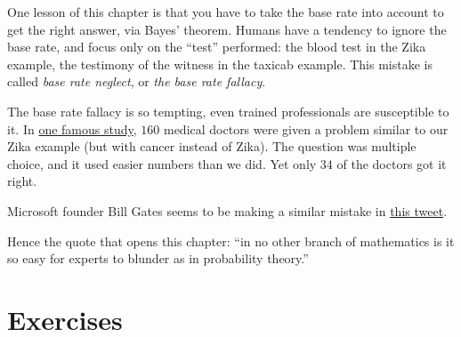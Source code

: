 \documentclass[justified]{tufte-book}
\theoremstyle{definition}
\theoremstyle{definition}
\theoremstyle{definition}
\theoremstyle{definition}
\theoremstyle{remark}
\begin{document}
One lesson of this chapter is that you have to take the base rate into account to get the right answer, via Bayes' theorem. Humans have a tendency to ignore the base rate, and focus only on the ``test'' performed: the blood test in the Zika example, the testimony of the witness in the taxicab example. This mistake is called \emph{base rate neglect}, or \emph{the base rate fallacy}.

The base rate fallacy is so tempting, even trained professionals are susceptible to it. In \href{https://www.stat.berkeley.edu/~aldous/157/Papers/health_stats.pdf}{one famous study}, \(160\) medical doctors were given a problem similar to our Zika example (but with cancer instead of Zika). The question was multiple choice, and it used easier numbers than we did. Yet only \(34\) of the doctors got it right.

\begin{marginfigure}
Microsoft founder Bill Gates seems to be making a similar mistake in
\href{https://twitter.com/BillGates/status/1118196606975787008}{this
tweet}.
\end{marginfigure}

Hence the quote that opens this chapter: ``in no other branch of mathematics is it so easy for experts to blunder as in probability theory.''

\hypertarget{exercises-6}{%
\section*{Exercises}\label{exercises-6}}
\end{document}

